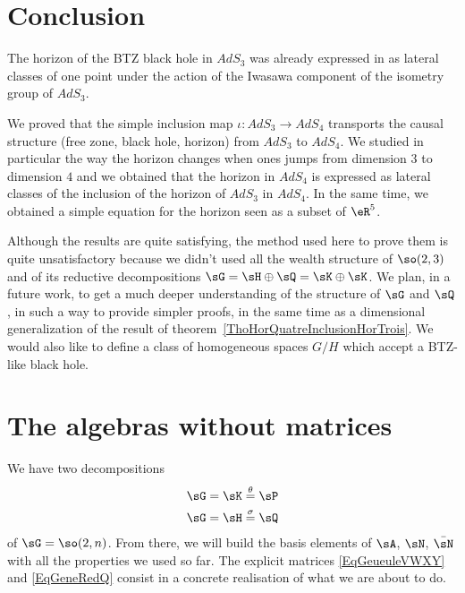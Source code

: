 \section{Conclusion}

The horizon of the BTZ black hole in $AdS_3$ was already expressed in \cite{Keio} as lateral classes of one point under the action of the Iwasawa component of the isometry group of $AdS_3$.

We proved that the simple inclusion map $\iota\colon AdS_3\to AdS_4$ transports the causal structure (free zone, black hole, horizon) from $AdS_3$ to $AdS_4$. We studied in particular the way the horizon changes when ones jumps from dimension $3$ to dimension $4$ and we obtained that the horizon in $AdS_4$ is expressed as lateral classes of the inclusion of the horizon of $AdS_3$ in $AdS_4$. In the same time, we obtained a simple equation for the horizon seen as a subset of $\eR^5$.

Although the results are quite satisfying, the method used here to prove them is quite unsatisfactory because we didn't used all the wealth structure of $\so(2,3)$ and of its reductive decompositions $\sG=\sH\oplus\sQ=\sK\oplus\sK$. We plan, in a future work, to get a much deeper understanding of the structure of $\sG$ and $\sQ$, in such a way to provide simpler proofs, in the same time as a dimensional generalization of the result of theorem~\ref{ThoHorQuatreInclusionHorTrois}. We would also like to define a class of homogeneous spaces $G/H$ which accept a BTZ-like black hole.


\section{The algebras without matrices}
\label{SecRebuildStructRoot}

We have two decompositions
\begin{equation}
	\begin{aligned}[]
		\sG&=\sK\stackrel{\theta}{=}\sP\\
		\sG&=\sH\stackrel{\sigma}{=}\sQ
	\end{aligned}
\end{equation}
of $\sG=\so(2,n)$. From there, we will build the basis elements of $\sA$, $\sN$, $\bar\sN$ with all the properties we used so far. The explicit matrices \eqref{EqGeueuleVWXY} and \eqref{EqGeneRedQ} consist in a concrete realisation of what we are about to do.


